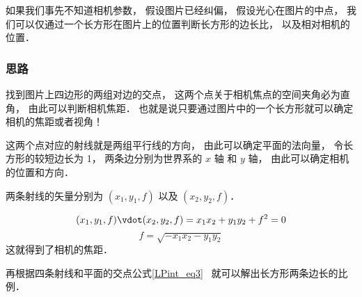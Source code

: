 
\begin{issues}
\issueDraft
\end{issues}


如果我们事先不知道相机参数， 假设图片已经纠偏， 假设光心在图片的中点， 我们可以仅通过一个长方形在图片上的位置判断长方形的边长比， 以及相对相机的位置．

\subsubsection{思路}

找到图片上四边形的两组对边的交点， 这两个点关于相机焦点的空间夹角必为直角， 由此可以判断相机焦距． 也就是说只要通过图片中的一个长方形就可以确定相机的焦距或者视角！

这两个点对应的射线就是两组平行线的方向， 由此可以确定平面的法向量， 令长方形的较短边长为 1， 两条边分别为世界系的 $x$ 轴 和 $y$ 轴， 由此可以确定相机的位置和方向．

两条射线的矢量分别为 $(x_1, y_1, f)$ 以及 $(x_2, y_2, f)$．

\begin{equation}
(x_1, y_1, f)\vdot (x_2, y_2, f) = x_1 x_2 + y_1 y_2 + f^2 = 0
\end{equation}
\begin{equation}
f = \sqrt{-x_1 x_2 - y_1 y_2}
\end{equation}
这就得到了相机的焦距．

再根据四条射线和平面的交点公式\autoref{LPint_eq3}~ 就可以解出长方形两条边长的比例．
